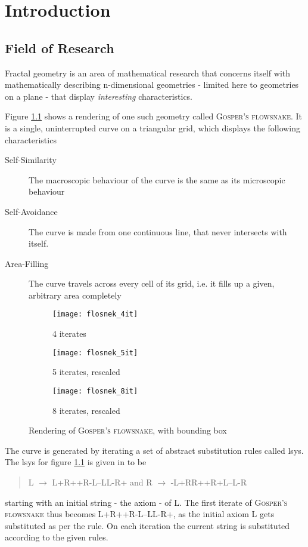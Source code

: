 \chapter{Introduction}
\label{cha:Intro}

\section{Field of Research}

Fractal geometry is an area of mathematical research that concerns itself with mathematically describing n-dimensional geometries - limited here to geometries on a plane - that display \textit{interesting} characteristics. 

Figure \ref{fig:flosnek} shows a rendering of one such geometry called \textsc{Gosper's flowsnake}.
It is a single, uninterrupted curve on a triangular grid, which displays the following characteristics

\begin{description}
	\item [Self-Similarity] The macroscopic behaviour of the curve is the same as its microscopic behaviour
	\item [Self-Avoidance] The curve is made from one continuous line, that never intersects with itself.
	\item [Area-Filling] The curve travels across every cell of its grid, i.e. it fills up a given, arbitrary area completely
\end{description}

\begin{figure}[h]
\centering
\begin{subfigure}{.33\textwidth}
  \centering
  \texttt{[image: flosnek\_4it]}
  \caption{4 iterates}
\end{subfigure}%
\begin{subfigure}{.33\textwidth}
  \centering
  \texttt{[image: flosnek\_5it]}
  \caption{5 iterates, rescaled}
\end{subfigure}%
\begin{subfigure}{.33\textwidth}
  \centering
  \texttt{[image: flosnek\_8it]}
  \caption{8 iterates, rescaled}
\end{subfigure}
\caption{Rendering of \textsc{Gosper's flowsnake}, with \gls{bounding box}}
	\label{fig:flosnek}
\end{figure}

The curve is generated by iterating a set of abstract substitution rules called \gls{lsys}.
The \gls{lsys} for figure \ref{fig:flosnek} is given in \citet{Arndt2016} to be 
\begin{quote}
	\centering
	L $\rightarrow$ L+R++R-L--LL-R+ \quad and \quad R $\rightarrow$ -L+RR++R+L--L-R
\end{quote}
starting with an initial string -  the \gls{axiom} - of L. The first iterate of \textsc{Gosper's flowsnake} thus becomes L+R++R-L--LL-R+, as the initial \gls{axiom} L gets substituted as per the rule. 
On each iteration the current string is substituted according to the given rules.

